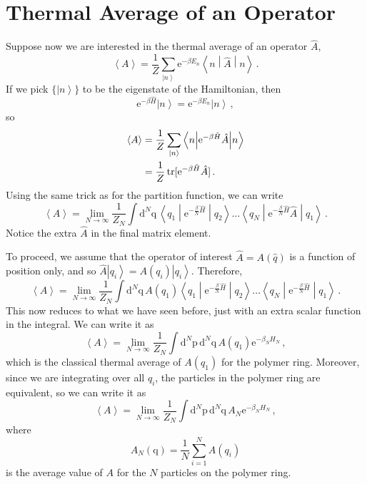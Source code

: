 \documentclass{article}
\theoremstyle{plain}\theoremheaderfont{\normalfont\itshape}\theorembodyfont{\rmfamily}\theoremseparator{.}\newtheorem*{rem}{Remark}\newtheorem*{ex}{Example}\newtheorem*{proof}{Proof}\newtheorem*{altp}{Alternative proof}
\theoremstyle{plain}\theoremheaderfont{\normalfont\bfseries}\theorembodyfont{\rmfamily}\theoremseparator{.}\newtheorem{thm}{Theorem}[section]\newtheorem{lem}[thm]{Lemma}\newtheorem{prop}[thm]{Proposition}\newtheorem*{cor}{Corollary}\newtheorem{defn}[thm]{Definition}\newtheorem{clm}[thm]{Claim}\newtheorem{clminproof}{Claim}
\theoremstyle{break}\theoremheaderfont{\normalfont\itshape}\theorembodyfont{\rmfamily}\theoremseparator{.\medskip}\newtheorem*{proofskip}{Proof}\newtheorem*{exs}{Examples}\newtheorem*{rems}{Remarks}
\theoremstyle{break}\theoremheaderfont{\normalfont\bfseries}\theorembodyfont{\rmfamily}\theoremseparator{.\medskip}\newtheorem{lemskip}[thm]{Lemma}\newtheorem{defnskip}[thm]{Definition}\newtheorem{propskip}[thm]{Proposition}\newtheorem{thmskip}[thm]{Theorem}
\numberwithin{equation}{section}
\newcommand{\ee}{\mathrm{e}}
\newcommand{\dd}[2][]{\mathrm{d}^{#1} #2\,}
\newcommand{\ket}[1]{\left| #1 \right\rangle}
\newcommand{\mel}[3]{\left\langle #1 \middle| #2 \middle| #3 \right\rangle}
\newcommand{\eval}[1]{\left\langle #1 \right\rangle}
\newcommand{\expval}[2]{\left\langle #2 \middle| #1 \middle| #2 \right\rangle}
\newcommand{\vb}[1]{\bm{\mathrm{#1}}}
\DeclareMathOperator{\tr}{tr}
\begin{document}
    \section{Thermal Average of an Operator}
    Suppose now we are interested in the thermal average of an operator \(\hat{A}\),
    \begin{equation}
        \eval{A}=\frac{1}{Z}\sum_{\ket{n}}\ee^{-\beta E_n}\expval{\hat{A}}{n}\,.
    \end{equation}
    If we pick \(\{\ket{n}\}\) to be the eigenstate of the Hamiltonian, then
    \begin{equation}
        \ee^{-\beta\hat{H}}\ket{n}=\ee^{-\beta E_n}\ket{n}\,,
    \end{equation}
    so
    \begin{align}
        \eval{A}&=\frac{1}{Z}\sum_{\ket{n}}\expval{\ee^{-\beta \hat{H}}\hat{A}}{n}\notag \\
        &=\frac{1}{Z}\tr[\ee^{-\beta\hat{H}}\hat{A}]\,.
    \end{align}
    Using the same trick as for the partition function, we can write
    \begin{equation}
        \eval{A}=\lim_{N\to\infty}\frac{1}{Z_N}\int\dd[N]{\vb{q}}\mel{q_1}{\ee^{-\frac{\beta}{N}\hat{H}}}{q_2}\dots\mel{q_N}{\ee^{-\frac{\beta}{N}\hat{H}}\hat{A}}{q_1}\,.
    \end{equation}
    Notice the extra \(\hat{A}\) in the final matrix element.
    
    To proceed, we assume that the operator of interest \(\hat{A}=A(\hat{q})\) is a function of position only, and so \(\hat{A}\ket{q_i}=A(q_i)\ket{q_i}\). Therefore,
    \begin{equation}
        \eval{A}=\lim_{N\to\infty}\frac{1}{Z_N}\int\dd[N]{\vb{q}}A(q_1)\mel{q_1}{\ee^{-\frac{\beta}{N}\hat{H}}}{q_2}\dots\mel{q_N}{\ee^{-\frac{\beta}{N}\hat{H}}}{q_1}\,.
    \end{equation}
    This now reduces to what we have seen before, just with an extra scalar function in the integral. We can write it as
    \begin{equation}
        \eval{A}=\lim_{N\to\infty}\frac{1}{Z_N}\int\dd[N]{\vb{p}}\dd[N]{\vb{q}} A(q_1)\ee^{-\beta_N H_N}\,,
    \end{equation}
    which is the classical thermal average of \(A(q_1)\) for the polymer ring. Moreover, since we are integrating over all \(q_i\), the particles in the polymer ring are equivalent, so we can write it as
    \begin{equation}
        \eval{A}=\lim_{N\to\infty}\frac{1}{Z_N}\int\dd[N]{\vb{p}}\dd[N]{\vb{q}} A_N\ee^{-\beta_N H_N}\,,
    \end{equation}
    where
    \begin{equation}\label{ring_polymer_observable}
        A_N(\vb{q})=\frac{1}{N}\sum_{i=1}^{N}A(q_i)
    \end{equation}
    is the average value of \(A\) for the \(N\) particles on the polymer ring.
\end{document}
